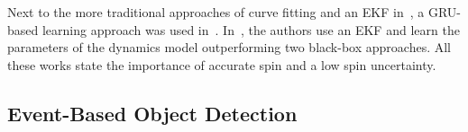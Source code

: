 Next to the more traditional approaches of curve fitting and an \ac{EKF} in~\cite{Tebbe2019gcpr}, a GRU-based learning approach was used in~\cite{Gao2022ijcnn}.
%
In~\cite{Achterhold2023l4dc}, the authors use an \ac{EKF} and learn the parameters of the dynamics model outperforming two black-box approaches.
%
All these works state the importance of accurate spin and a low spin uncertainty.


%
%
%


\subsection{Event-Based Object Detection}\label{subsec:rel_ebod}

